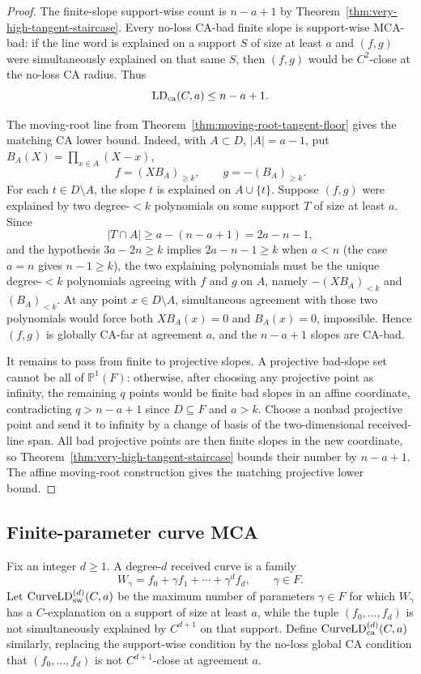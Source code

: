 \begin{proof}
The finite-slope support-wise count is \(n-a+1\) by
Theorem~\ref{thm:very-high-tangent-staircase}.  Every no-loss CA-bad finite
slope is support-wise MCA-bad: if the line word is explained on a support
\(S\) of size at least \(a\) and \((f,g)\) were simultaneously explained on
that same \(S\), then \((f,g)\) would be \(C^2\)-close at the no-loss CA radius.
Thus
\[
  \operatorname{LD}_{\rm ca}(C,a)\le n-a+1 .
\]

The moving-root line from Theorem~\ref{thm:moving-root-tangent-floor} gives the
matching CA lower bound.  Indeed, with \(A\subset D\), \(|A|=a-1\), put
\(B_A(X)=\prod_{x\in A}(X-x)\),
\[
  f=(XB_A)_{\ge k},
  \qquad
  g=-(B_A)_{\ge k}.
\]
For each \(t\in D\setminus A\), the slope \(t\) is explained on
\(A\cup\{t\}\).  Suppose \((f,g)\) were explained by two degree-\(<k\)
polynomials on some support \(T\) of size at least \(a\).  Since
\[
  |T\cap A|\ge a-(n-a+1)=2a-n-1,
\]
and the hypothesis \(3a-2n\ge k\) implies \(2a-n-1\ge k\) when \(a<n\)
(the case \(a=n\) gives \(n-1\ge k\)), the two explaining polynomials must be
the unique degree-\(<k\) polynomials agreeing with \(f\) and \(g\) on \(A\),
namely \(-(XB_A)_{<k}\) and \((B_A)_{<k}\).  At any point
\(x\in D\setminus A\), simultaneous agreement with those two polynomials would
force both \(XB_A(x)=0\) and \(B_A(x)=0\), impossible.  Hence \((f,g)\) is
globally CA-far at agreement \(a\), and the \(n-a+1\) slopes are CA-bad.

It remains to pass from finite to projective slopes.  A projective bad-slope
set cannot be all of \(\mathbb P^1(F)\): otherwise, after choosing any
projective point as infinity, the remaining \(q\) points would be finite bad
slopes in an affine coordinate, contradicting
\(q>n-a+1\) since \(D\subseteq F\) and \(a>k\).  Choose a nonbad projective
point and send it to infinity by a change of basis of the two-dimensional
received-line span.  All bad projective points are then finite slopes in the
new coordinate, so Theorem~\ref{thm:very-high-tangent-staircase} bounds their
number by \(n-a+1\).  The affine moving-root construction gives the matching
projective lower bound.
\end{proof}

\subsection{Finite-parameter curve MCA}

Fix an integer \(d\ge1\).  A degree-\(d\) received curve is a family
\[
  W_\gamma=f_0+\gamma f_1+\cdots+\gamma^d f_d,
  \qquad \gamma\in F .
\]
Let \(\operatorname{CurveLD}_{\rm sw}^{(d)}(C,a)\) be the maximum number of
parameters \(\gamma\in F\) for which \(W_\gamma\) has a \(C\)-explanation on a
support of size at least \(a\), while the tuple \((f_0,\ldots,f_d)\) is not
simultaneously explained by \(C^{d+1}\) on that support.  Define
\(\operatorname{CurveLD}_{\rm ca}^{(d)}(C,a)\) similarly, replacing the
support-wise condition by the no-loss global CA condition that
\((f_0,\ldots,f_d)\) is not \(C^{d+1}\)-close at agreement \(a\).


